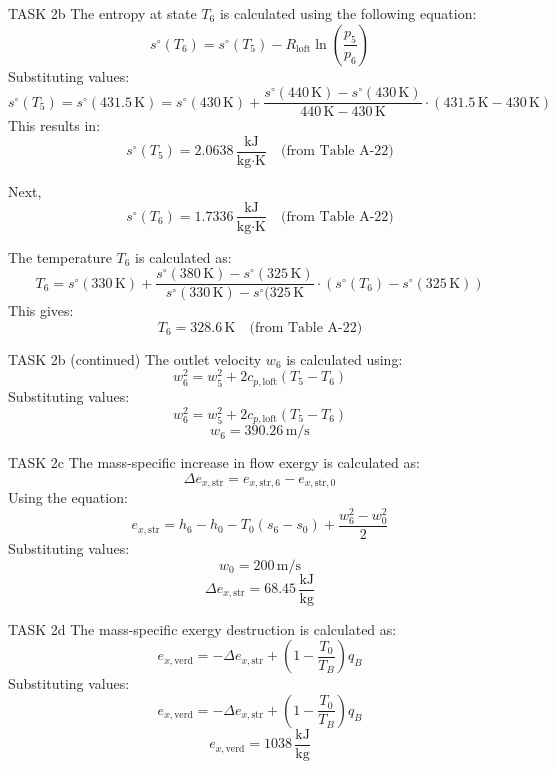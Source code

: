 TASK 2b  
The entropy at state \( T_6 \) is calculated using the following equation:  
\[
s^\circ(T_6) = s^\circ(T_5) - R_{\text{loft}} \ln\left(\frac{p_5}{p_6}\right)
\]  
Substituting values:  
\[
s^\circ(T_5) = s^\circ(431.5 \, \text{K}) = s^\circ(430 \, \text{K}) + \frac{s^\circ(440 \, \text{K}) - s^\circ(430 \, \text{K})}{440 \, \text{K} - 430 \, \text{K}} \cdot (431.5 \, \text{K} - 430 \, \text{K})
\]  
This results in:  
\[
s^\circ(T_5) = 2.0638 \, \frac{\text{kJ}}{\text{kg·K}} \quad \text{(from Table A-22)}
\]  

Next,  
\[
s^\circ(T_6) = 1.7336 \, \frac{\text{kJ}}{\text{kg·K}} \quad \text{(from Table A-22)}
\]  

The temperature \( T_6 \) is calculated as:  
\[
T_6 = s^\circ(330 \, \text{K}) + \frac{s^\circ(380 \, \text{K}) - s^\circ(325 \, \text{K})}{s^\circ(330 \, \text{K}) - s^\circ(325 \, \text{K}} \cdot (s^\circ(T_6) - s^\circ(325 \, \text{K}))
\]  
This gives:  
\[
T_6 = 328.6 \, \text{K} \quad \text{(from Table A-22)}
\]  

TASK 2b (continued)  
The outlet velocity \( w_6 \) is calculated using:  
\[
w_6^2 = w_5^2 + 2 c_{p,\text{loft}} (T_5 - T_6)
\]  
Substituting values:  
\[
w_6^2 = w_5^2 + 2 c_{p,\text{loft}} (T_5 - T_6)
\]  
\[
w_6 = 390.26 \, \text{m/s}
\]  

TASK 2c  
The mass-specific increase in flow exergy is calculated as:  
\[
\Delta e_{x,\text{str}} = e_{x,\text{str},6} - e_{x,\text{str},0}
\]  
Using the equation:  
\[
e_{x,\text{str}} = h_6 - h_0 - T_0 (s_6 - s_0) + \frac{w_6^2 - w_0^2}{2}
\]  
Substituting values:  
\[
w_0 = 200 \, \text{m/s}
\]  
\[
\Delta e_{x,\text{str}} = 68.45 \, \frac{\text{kJ}}{\text{kg}}
\]  

TASK 2d  
The mass-specific exergy destruction is calculated as:  
\[
e_{x,\text{verd}} = -\Delta e_{x,\text{str}} + \left(1 - \frac{T_0}{T_B}\right) q_B
\]  
Substituting values:  
\[
e_{x,\text{verd}} = -\Delta e_{x,\text{str}} + \left(1 - \frac{T_0}{T_B}\right) q_B
\]  
\[
e_{x,\text{verd}} = 1038 \, \frac{\text{kJ}}{\text{kg}}
\]